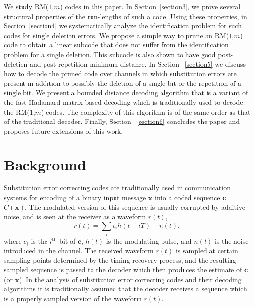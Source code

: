 We study RM($1$,$m$) codes in this paper. In
Section~\ref{section3}, we prove several structural properties of
the run-lengths of such a code. Using these properties, in
Section~\ref{section4} we systematically analyze the
identification problem for such codes for single deletion errors.
We propose a simple way to prune an RM($1$,$m$) code to obtain a
linear subcode that does not suffer from the identification
problem for a single deletion. This subcode is also shown to have
good post-deletion and post-repetition minimum distance. In
Section ~\ref{section5} we discuss how to decode the pruned code
over channels in which substitution errors are present in addition
to possibly the deletion of a single bit or the repetition of a
single bit. We present a bounded distance decoding algorithm that
is a variant of the fast Hadamard matrix based decoding which is
traditionally used to decode the RM($1$,$m$) codes. The complexity
of this algorithm is of the same order as that of the traditional
decoder. Finally, Section ~\ref{section6} concludes the paper and
proposes future extensions of this work.

\section{Background}

Substitution error correcting codes are traditionally used in
communication systems for encoding of a binary input message
$\mathbf{x}$ into a coded sequence $\mathbf{c}$ = $C(\mathbf{x})$.
The modulated version of this sequence is usually corrupted by
additive noise, and is seen at the receiver as a waveform $r(t)$,
\begin{equation}\label{eq:rt}
r(t)=\sum_{i} c_i h(t-iT) +n(t),
\end{equation}
where $c_i$ is the $i^{\text{th}}$ %
bit of $\mathbf{c}$, $h(t)$ is the modulating pulse, and $n(t)$ is
the noise introduced in the channel. The received waveform $r(t)$
is sampled at certain sampling points determined by the timing
recovery process, and the resulting sampled sequence is passed to
the decoder which then produces the estimate of $\mathbf{c}$ (or
$\mathbf{x}$). In the analysis of substitution error correcting
codes and their decoding algorithms it is traditionally assumed
that the decoder receives a sequence which is a properly sampled
version of the waveform $r(t)$.


